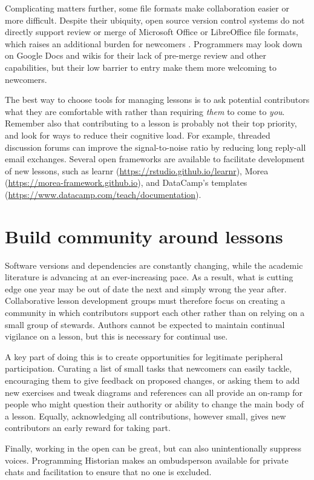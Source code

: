 \documentclass[10pt,letterpaper]{article}
\newcommand{\rulemajor}[2]{\section{#1}\label{#2}}
\begin{document}
Complicating matters further,
some file formats make collaboration easier or more difficult.
Despite their ubiquity,
open source version control systems do not directly support review or merge
of Microsoft Office or LibreOffice file formats,
which raises an additional burden for newcomers \cite{jacobs}.
Programmers may look down on Google Docs and wikis
for their lack of pre-merge review and other capabilities,
but their low barrier to entry make them more welcoming to newcomers.

The best way to choose tools for managing lessons is
to ask potential contributors what they are comfortable with
rather than requiring \emph{them} to come to \emph{you}.
Remember also that contributing to a lesson is probably not their top priority,
and look for ways to reduce their cognitive load.
For example,
threaded discussion forums can improve the signal-to-noise ratio
by reducing long reply-all email exchanges.
Several open frameworks are available to facilitate development of new lessons,
such as learnr (\url{https://rstudio.github.io/learnr}),
Morea (\url{https://morea-framework.github.io}),
and DataCamp's templates (\url{https://www.datacamp.com/teach/documentation}).

\rulemajor{Build community around lessons}{community}

Software versions and dependencies are constantly changing,
while the academic literature is advancing at an ever-increasing pace.
As a result,
what is cutting edge one year may be out of date the next and simply wrong the year after.
Collaborative lesson development groups must therefore focus
on creating a community in which contributors support each other
rather than on relying on a small group of stewards.
Authors cannot be expected to maintain continual vigilance on a lesson,
but this is necessary for continual use.

A key part of doing this is to create opportunities for legitimate peripheral participation.
Curating a list of small tasks that newcomers can easily tackle,
encouraging them to give feedback on proposed changes,
or asking them to add new exercises and tweak diagrams and references
can all provide an on-ramp for people who might question their authority or ability to change the main body of a lesson.
Equally,
acknowledging all contributions,
however small,
gives new contributors an early reward for taking part.

Finally,
working in the open can be great,
but can also unintentionally suppress voices.
Programming Historian makes an ombudsperson available for private chats and facilitation
to ensure that no one is excluded.
\end{document}
